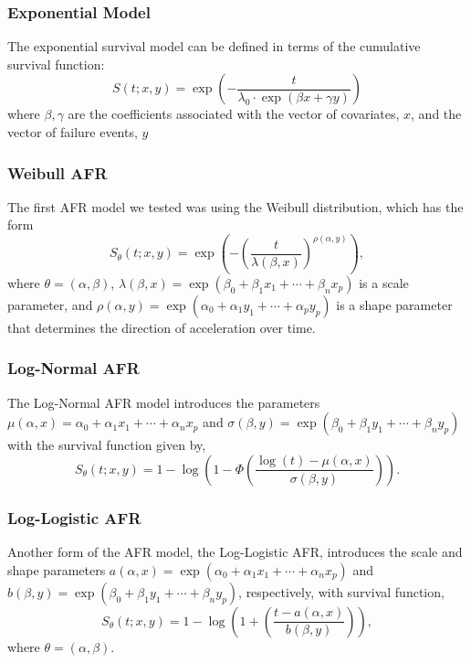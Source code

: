 \subsubsection{Exponential Model}
The exponential survival model can be defined in terms of the cumulative survival function:
$$
S(t; x, y) = \exp \left( -\frac{t}{\lambda_0 \cdot \exp(\beta x + \gamma y)} \right)
$$
where $\beta, \gamma$ are the coefficients associated with the vector of covariates, $x$, and the vector of failure events, $y$

\subsubsection{Weibull AFR}
The first AFR model we tested was using the Weibull distribution, which has the form
\[
	S_\theta(t; x, y) = \exp{\left( - \left( \frac{t}{\lambda(\beta, x)} \right)^{\rho(\alpha, y)} \right)},
\]
where $\theta=(\alpha, \beta)$, $\lambda(\beta, x)=\exp(\beta_0 + \beta_1 x_1 + \cdots + \beta_n x_p)$ is a scale parameter, and $\rho(\alpha, y)=\exp(\alpha_0 + \alpha_1 y_1 + \cdots + \alpha_p y_p)$ is a shape parameter that determines the direction of acceleration over time.

\subsubsection{Log-Normal AFR}

The Log-Normal AFR model introduces the parameters $\mu(\alpha, x) = \alpha_0 + \alpha_1 x_1 + \cdots + \alpha_n x_p $ and $\sigma(\beta, y) = \exp(\beta_0 + \beta_1 y_1 + \cdots + \beta_n y_p)$ with the survival function given by,
\[
	S_\theta(t; x, y) = 1 - \log \left( 1 - \Phi \left (  \frac{\log(t) - \mu(\alpha, x) }{ \sigma(\beta, y) } \right) \right).
\]



\subsubsection{Log-Logistic AFR}

Another form of the AFR model, the Log-Logistic AFR, introduces the scale and shape parameters $a(\alpha, x) = \exp(\alpha_0 + \alpha_1 x_1 + \cdots + \alpha_n x_p )$ and $b(\beta, y) = \exp(\beta_0 + \beta_1 y_1 + \cdots + \beta_n y_p)$, respectively, with survival function,
\[
	S_\theta(t; x, y) = 1 - \log \left( 1 + \left (  \frac{t - a(\alpha, x) }{ b(\beta, y) }\right)\right),
\]
where $\theta = (\alpha, \beta)$.



